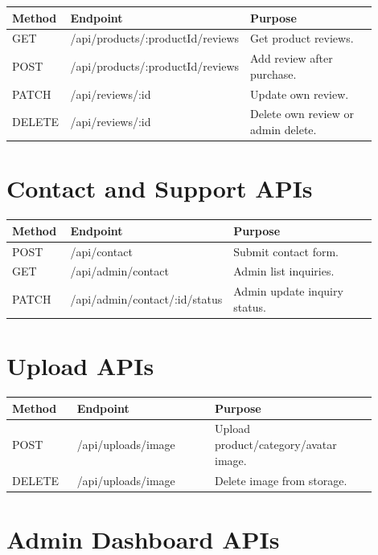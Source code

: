 \documentclass[11pt,a4paper]{article}
\begin{document}
\begin{longtable}{p{0.16\linewidth} p{0.34\linewidth} p{0.40\linewidth}}
\toprule
\textbf{Method} & \textbf{Endpoint} & \textbf{Purpose} \\
\midrule
GET & /api/products/:productId/reviews & Get product reviews. \\
POST & /api/products/:productId/reviews & Add review after purchase. \\
PATCH & /api/reviews/:id & Update own review. \\
DELETE & /api/reviews/:id & Delete own review or admin delete. \\
\bottomrule
\end{longtable}

\section{Contact and Support APIs}

\begin{longtable}{p{0.16\linewidth} p{0.34\linewidth} p{0.40\linewidth}}
\toprule
\textbf{Method} & \textbf{Endpoint} & \textbf{Purpose} \\
\midrule
POST & /api/contact & Submit contact form. \\
GET & /api/admin/contact & Admin list inquiries. \\
PATCH & /api/admin/contact/:id/status & Admin update inquiry status. \\
\bottomrule
\end{longtable}

\section{Upload APIs}

\begin{longtable}{p{0.16\linewidth} p{0.34\linewidth} p{0.40\linewidth}}
\toprule
\textbf{Method} & \textbf{Endpoint} & \textbf{Purpose} \\
\midrule
POST & /api/uploads/image & Upload product/category/avatar image. \\
DELETE & /api/uploads/image & Delete image from storage. \\
\bottomrule
\end{longtable}

\section{Admin Dashboard APIs}
\end{document}
